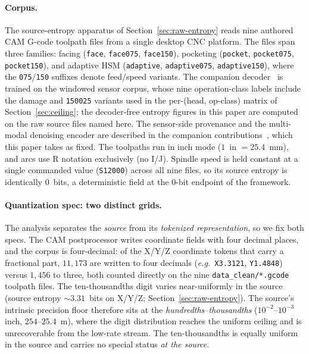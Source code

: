 \documentclass[entropy,article,submit,moreauthors,pdftex]{Definitions/mdpi}
\newcommand{\eg}{\textit{e.g.}}
\begin{document}
\paragraph{Corpus.} The source-entropy apparatus of Section~\ref{sec:raw-entropy} reads nine authored CAM G-code toolpath files from a single desktop CNC platform. The files span three families: facing (\texttt{face}, \texttt{face075}, \texttt{face150}), pocketing (\texttt{pocket}, \texttt{pocket075}, \texttt{pocket150}), and adaptive HSM (\texttt{adaptive}, \texttt{adaptive075}, \texttt{adaptive150}), where the \texttt{075}/\texttt{150} suffixes denote feed/speed variants. The companion decoder~\cite{paperA_decoder} is trained on the windowed sensor corpus, whose nine operation-class labels include the damage and \texttt{150025} variants used in the per-(head, op-class) matrix of Section~\ref{sec:ceiling}; the decoder-free entropy figures in this paper are computed on the raw source files named here. The sensor-side provenance and the multi-modal denoising encoder are described in the companion contributions~\cite{paperA_decoder,encoder_paper}, which this paper takes as fixed. The toolpaths run in inch mode ($1$~in $=25.4$~mm), and arcs use R notation exclusively (no I/J). Spindle speed is held constant at a single commanded value (\texttt{S12000}) across all nine files, so its source entropy is identically $0$~bits, a deterministic field at the $0$-bit endpoint of the framework.

\paragraph{Quantization spec: two distinct grids.} The analysis separates the \emph{source} from its \emph{tokenized representation}, so we fix both specs. The CAM postprocessor writes coordinate fields with four decimal places, and the corpus is four-decimal: of the X/Y/Z coordinate tokens that carry a fractional part, $11{,}173$ are written to four decimals (\eg\ \texttt{X3.3121}, \texttt{Y1.4848}) versus $1{,}456$ to three, both counted directly on the nine \texttt{data\_clean/*.gcode} toolpath files. The ten-thousandths digit varies near-uniformly in the source (source entropy $\sim\!3.31$~bits on X/Y/Z; Section~\ref{sec:raw-entropy}). The source's intrinsic precision floor therefore sits at the \emph{hundredths--thousandths} ($10^{-2}$--$10^{-3}$ inch, $254$--$25.4$~\textmu m), where the digit distribution reaches the uniform ceiling and is unrecoverable from the low-rate stream. The ten-thousandths is equally uniform in the source and carries no special status \emph{at the source}.
\end{document}
